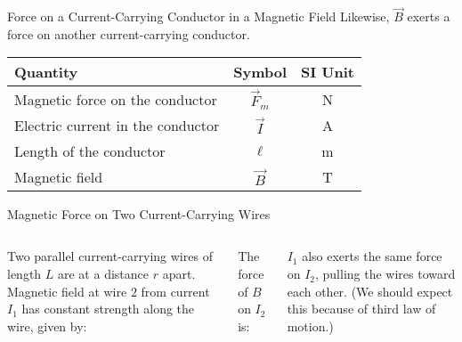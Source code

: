 \documentclass[12pt,aspectratio=169]{beamer}
\begin{document}
\begin{frame}{Force on a Current-Carrying Conductor in a Magnetic Field}
  Likewise, $\vec B$ exerts a force on another current-carrying conductor.

  \begin{center}
    \begin{tabular}{l|c|c}
      \rowcolor{pink}
      \textbf{Quantity} & \textbf{Symbol} & \textbf{SI Unit} \\ \hline
      Magnetic force on the conductor   & $\vec F_m$ & \si\newton \\
      Electric current in the conductor & $\vec I$   & \si\ampere \\
      Length of the conductor           & $\ell$     & \si\metre \\
      Magnetic field                    & $\vec B$   & \si\tesla
    \end{tabular}
  \end{center}
\end{frame}



\begin{frame}{Magnetic Force on Two Current-Carrying Wires}
  \begin{columns}

    Two parallel current-carrying wires of length $L$ are at a distance $r$
    apart. Magnetic field at wire $2$ from current $I_1$ has constant strength
    along the wire, given by:


    The force of $B$ on $I_2$ is:


    $I_1$ also exerts the same force on $I_2$, pulling the wires toward each
    other. (We should expect this because of third law of motion.)
  \end{columns}
\end{frame}
\end{document}
